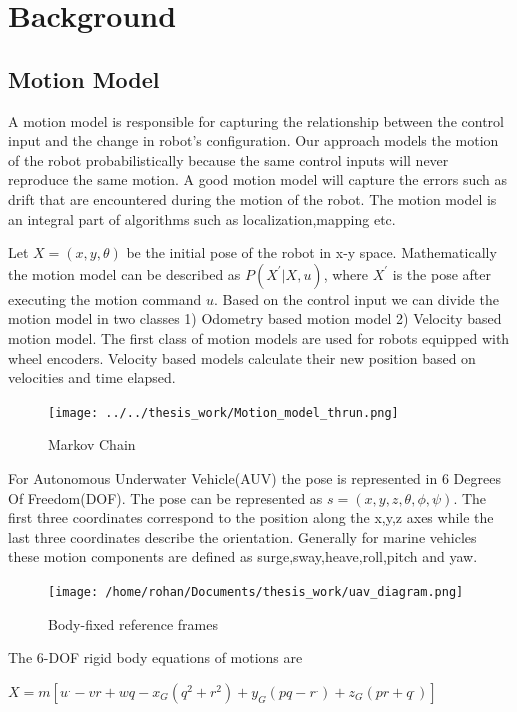 \documentclass[12pt]{dalcsthesis}
\begin{document}
\chapter{Background}
\section{Motion Model}
A motion model is responsible for capturing the relationship between
the control input and the change in robot's configuration. Our approach
models the motion of the robot probabilistically because the same
control inputs will never reproduce the same motion. A good motion
model will capture the errors such as drift that are encountered during
the motion of the robot. The motion model is an integral part of algorithms
such as localization,mapping etc. 

Let $X=(x,y,\theta)$ be the initial pose of the robot in x-y space.
Mathematically the motion model can be described as $P(X^{'}|X,u)$,
where $X^{'}$ is the pose after executing the motion command $u$.
Based on the control input we can divide the motion model in two classes
1) Odometry based motion model 2) Velocity based motion model. The
first class of motion models are used for robots equipped with wheel
encoders. Velocity based models calculate their new position based
on velocities and time elapsed.
\begin{figure}[hbtp]
\caption{Markov Chain}
\centering
\texttt{[image: ../../thesis\_work/Motion\_model\_thrun.png]}
\end{figure}

For Autonomous Underwater Vehicle(AUV) the pose is represented in
6 Degrees Of Freedom(DOF). The pose can be represented as $s=(x,y,z,\theta,\phi,\psi)$.
The first three coordinates correspond to the position along the x,y,z
axes while the last three coordinates describe the orientation. Generally
for marine vehicles these motion components are defined as surge,sway,heave,roll,pitch
and yaw. 

\begin{figure}
\caption{Body-fixed reference frames}


\texttt{[image: /home/rohan/Documents/thesis\_work/uav\_diagram.png]}

\end{figure}


The 6-DOF rigid body equations of motions are 

$X=m[u^{.}-vr+wq-x_{G}(q^{2}+r^{2})+y_{G}(pq-r^{.})+z_{G}(pr+q^{.})]$
\end{document}
